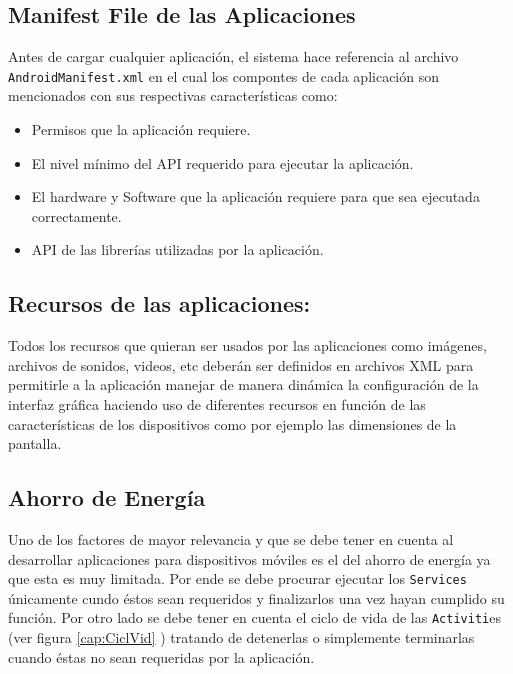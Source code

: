 \documentclass[letterpaper,12pt]{book}
\begin{document}
\begin{mainmatter}
\subsection{Manifest File de las Aplicaciones}

Antes de  cargar cualquier aplicación,  el sistema hace  referencia al
archivo  \texttt{AndroidManifest.xml}   en  el  cual  los   compontes  de  cada
aplicación son mencionados con sus respectivas características como:

\begin{itemize}
\item Permisos que la aplicación  requiere.
\item El nivel mínimo del API requerido para ejecutar la aplicación.
\item El hardware y Software que la aplicación requiere para que sea ejecutada correctamente.
\item API de las librerías utilizadas por la aplicación.
\end{itemize}
  

\subsection{Recursos de las aplicaciones:}
Todos los  recursos que quieran  ser usados por las  aplicaciones como
imágenes, archivos  de sonidos, videos,  etc deberán ser  definidos en
archivos  XML  para  permitirle  a  la aplicación  manejar  de  manera
dinámica  la configuración  de  la interfaz  gráfica  haciendo uso  de
diferentes  recursos   en  función  de  las   características  de  los
dispositivos como por ejemplo las dimensiones de la pantalla.

\subsection{Ahorro de Energía}

Uno de los factores de mayor  relevancia y que se debe tener en cuenta
al desarrollar aplicaciones para dispositivos móviles es el del ahorro
de energía  ya que esta  es muy limitada.  Por ende se  debe procurar
ejecutar  los  \texttt{Services}  únicamente  cundo  éstos  sean  requeridos  y
finalizarlos una vez hayan cumplido  su función. Por otro lado se debe
tener  en  cuenta el  ciclo  de vida  de  las  \texttt{Activiti}es (ver figura \ref{cap:CiclVid}
) tratando  de detenerlas o  simplemente 
terminarlas cuando éstas  no sean requeridas por la aplicación. 




\end{mainmatter}
\end{document}

